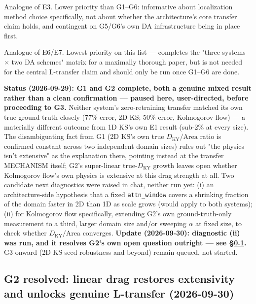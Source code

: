 \documentclass[11pt]{article}
\begin{document}
\begin{description}[style=nextline,leftmargin=1.2em]
\item[G7 --- SEC vs.\ Gaspari--Cohn refit at transfer size, both 2D systems.] \label{exp:g7}
Analogue of E3. Lower priority than G1--G6: informative about
localization method choice specifically, not about whether the
architecture's core transfer claim holds, and contingent on G5/G6's own
DA infrastructure being in place first.

\item[G8 --- LETKF cross-check, both 2D systems.] \label{exp:g8}
Analogue of E6/E7. Lowest priority on this list --- completes the "three
systems $\times$ two DA schemes" matrix for a maximally thorough paper,
but is not needed for the central L-transfer claim and should only be
run once G1--G6 are done.

\end{description}

\textbf{Status (2026-09-29): G1 and G2 complete, both a genuine mixed
result rather than a clean confirmation --- paused here, user-directed,
before proceeding to G3.} Neither system's zero-retraining transfer
matched its own true ground truth closely (77\% error, 2D KS; 50\%
error, Kolmogorov flow) --- a materially different outcome from 1D KS's
own E1 result (sub-2\% at every size). The disambiguating fact from G1
(2D KS's own true $D_{\mathrm{KY}}/\mathrm{Area}$ ratio is confirmed
constant across two independent domain sizes) rules out "the physics
isn't extensive" as the explanation there, pointing instead at the
transfer MECHANISM itself; G2's super-linear true-$D_{\mathrm{KY}}$
growth leaves open whether Kolmogorov flow's own physics is extensive at
this drag strength at all. Two candidate next diagnostics were raised in
chat, neither run yet: (i) an architecture-side hypothesis that a fixed
\texttt{attn\_window} covers a shrinking fraction of the domain faster in
2D than 1D as scale grows (would apply to both systems); (ii) for
Kolmogorov flow specifically, extending G2's own ground-truth-only
measurement to a third, larger domain size and/or sweeping $\alpha$ at
fixed size, to check whether $D_{\mathrm{KY}}/\mathrm{Area}$ converges.
\textbf{Update (2026-09-30): diagnostic (ii) was run, and it resolves
G2's own open question outright --- see \S\ref{sec:g2_resolved}.} G3
onward (2D KS seed-robustness and beyond) remain queued, not started.

\subsection{G2 resolved: linear drag restores extensivity and unlocks genuine L-transfer (2026-09-30)}
\label{sec:g2_resolved}
\end{document}
